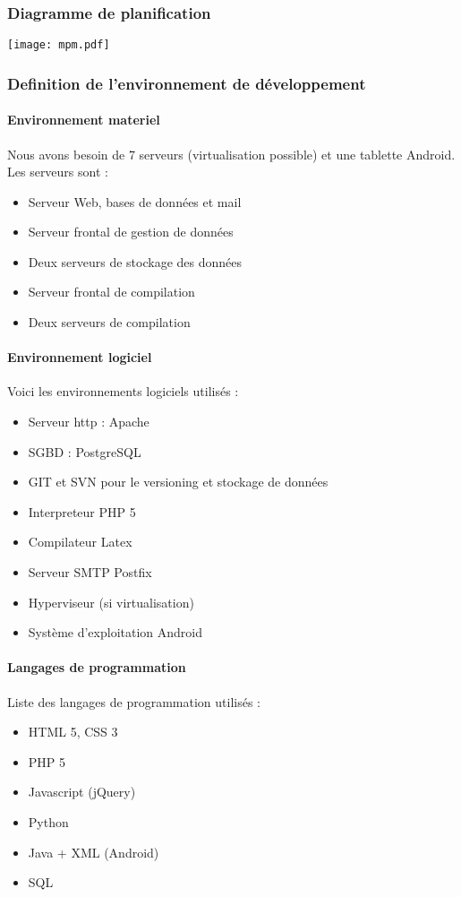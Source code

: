 \documentclass[a4paper,12pt]{article}
\begin{document}
\subsubsection{Diagramme de planification}
\texttt{[image: mpm.pdf]}
\newpage
\subsubsection{Definition de l'environnement de développement\\}

\paragraph{Environnement materiel\\} 
Nous avons besoin de 7 serveurs (virtualisation possible) et une tablette Android. Les serveurs sont :
\begin{itemize}
 \item Serveur Web, bases de données et mail
 \item Serveur frontal de gestion de données
 \item Deux serveurs de stockage des données
 \item Serveur frontal de compilation
 \item Deux serveurs de compilation
\end{itemize}

\bigskip

\paragraph{Environnement logiciel\\}
Voici les environnements logiciels utilisés :
\begin{itemize}
 \item Serveur http : Apache
 \item SGBD : PostgreSQL
 \item GIT et SVN pour le versioning et stockage de données
 \item Interpreteur PHP 5  
 \item Compilateur Latex
 \item Serveur SMTP Postfix
 \item Hyperviseur (si virtualisation)
 \item Système d'exploitation Android
\end{itemize}
 

\paragraph{Langages de programmation\\}
Liste des langages de programmation utilisés :
\begin{itemize}
 \item HTML 5, CSS 3
 \item PHP 5
 \item Javascript (jQuery)
 \item Python
 \item Java + XML (Android)
 \item SQL
\end{itemize}
\newpage
\end{document}
